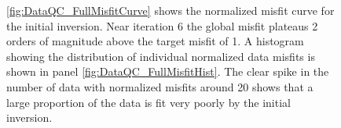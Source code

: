 \documentclass[final,authoryear,5p,times,twocolumn]{elsarticle}
\begin{document}
\begin{figure} [!ht]
    \begin{center}
    \end{center}
\caption{\ref{fig:DataQC_FullMisfitCurve} shows the normalized misfit curve for the initial inversion. Near iteration 6 the global misfit plateaus 2 orders of magnitude above the target misfit of 1. A histogram showing the distribution of individual normalized data misfits is shown in panel \ref{fig:DataQC_FullMisfitHist}. The clear spike in the number of data with normalized misfits around 20 shows that a large proportion of the data is fit very poorly by the initial inversion.}
\label{fig:DataQC_FullMisfit}
\end{figure}
\end{document}
